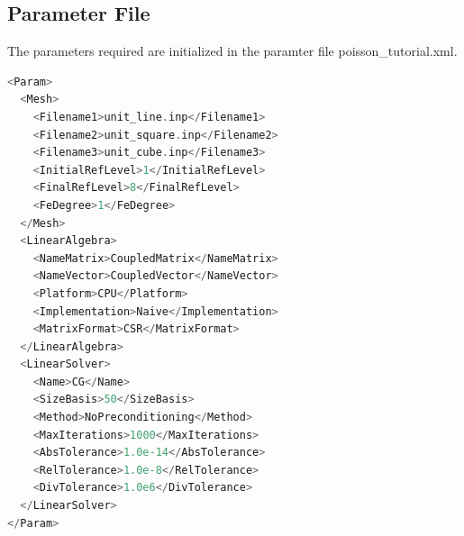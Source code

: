 \documentclass[a4paper, 11pt, twoside]{article}
\begin{document}
\subsection{Parameter File}\label{sectionparameter file}
The parameters required are initialized in the paramter file poisson\_tutorial.xml.
\begin{lstlisting}[language=C++, basicstyle={\footnotesize, \ttfamily}, keywordstyle=\color{blue}, numbers=none, tabsize=4]
<Param>
  <Mesh>
    <Filename1>unit_line.inp</Filename1>
    <Filename2>unit_square.inp</Filename2>
    <Filename3>unit_cube.inp</Filename3>
    <InitialRefLevel>1</InitialRefLevel>
    <FinalRefLevel>8</FinalRefLevel>
    <FeDegree>1</FeDegree>
  </Mesh>
  <LinearAlgebra>
    <NameMatrix>CoupledMatrix</NameMatrix>
    <NameVector>CoupledVector</NameVector>
    <Platform>CPU</Platform>
    <Implementation>Naive</Implementation>
    <MatrixFormat>CSR</MatrixFormat>
  </LinearAlgebra>
  <LinearSolver>
    <Name>CG</Name>
    <SizeBasis>50</SizeBasis>
    <Method>NoPreconditioning</Method>
    <MaxIterations>1000</MaxIterations>
    <AbsTolerance>1.0e-14</AbsTolerance>
    <RelTolerance>1.0e-8</RelTolerance>
    <DivTolerance>1.0e6</DivTolerance>
  </LinearSolver>
</Param>
\end{lstlisting}
\end{document}
